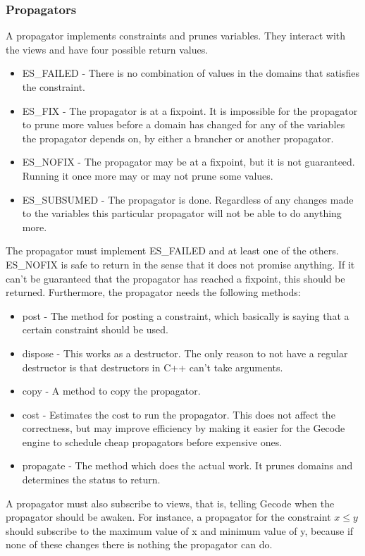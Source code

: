 \documentclass[a4paper,11pt]{article}
\begin{document}
\subsubsection{Propagators}
A propagator implements constraints and prunes variables. They interact with the views and have four possible return values.
\begin{itemize}
\item{ES\_FAILED} - There is no combination of values in the domains that satisfies the constraint. 
\item{ES\_FIX} - The propagator is at a fixpoint. It is impossible for the propagator to prune more values before a domain has changed for any of the variables the propagator depends on, by either a brancher or another propagator.
\item{ES\_NOFIX} - The propagator may be at a fixpoint, but it is not guaranteed. Running it once more may or may not prune some values. 
\item{ES\_SUBSUMED} - The propagator is done. Regardless of any changes made to the variables this particular propagator will not be able to do anything more.
\end{itemize}
The propagator must implement ES\_FAILED and at least one of the others. ES\_NOFIX is safe to return in the sense that it does not promise anything. If it can't be guaranteed that the propagator has reached a fixpoint, this should be returned. Furthermore, the propagator needs the following methods:
\begin{itemize}
\item{post} - The method for posting a constraint, which basically is saying that a certain constraint should be used.
\item{dispose} - This works as a destructor. The only reason to not have a regular destructor is that destructors in C++ can't take arguments.
\item{copy} - A method to copy the propagator.
\item{cost} - Estimates the cost to run the propagator. This does not affect the correctness, but may improve efficiency by making it easier for the Gecode engine to schedule cheap propagators before expensive ones.
\item{propagate} - The method which does the actual work. It prunes domains and determines the status to return.
\end{itemize}
A propagator must also subscribe to views, that is, telling Gecode when the propagator should be awaken. For instance, a propagator for the constraint $x\le y$ should subscribe to the maximum value of x and minimum value of y, because if none of these changes there is nothing the propagator can do.
\end{document}
